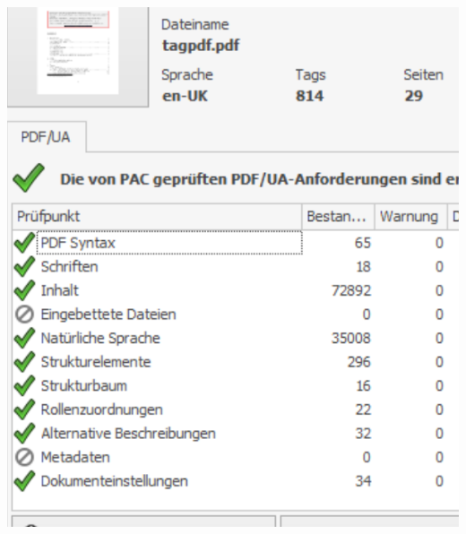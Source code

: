 \documentclass[bibliography=totoc,a4paper]{article}
\begin{document}
\includegraphics[alt=PAC 3 report]{pac3}
\end{document}
